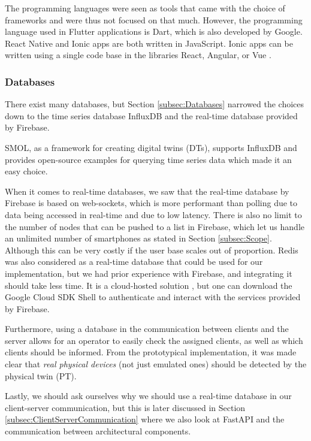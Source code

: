 \documentclass{article}
\begin{document}
The programming languages were seen as tools that came with the choice of frameworks and were thus not focused on that much. However, the programming language used in Flutter applications is Dart, which is also developed by Google. React Native and Ionic apps are both written in JavaScript. Ionic apps can be written using a single code base in the libraries React, Angular, or Vue \cite{noauthor_ionic_nodate}.

\subsubsection{Databases}\label{subsubsection:Databases}
There exist many databases, but Section \ref{subsec:Databases} narrowed the choices down to the time series database InfluxDB and the real-time database provided by Firebase. 

SMOL, as a framework for creating digital twins (DTs), supports InfluxDB and provides open-source examples for querying time series data which made it an easy choice. 

When it comes to real-time databases, we saw that the real-time database by Firebase is based on web-sockets, which is more performant than polling due to data being accessed in real-time and due to low latency. There is also no limit to the number of nodes that can be pushed to a list in Firebase, which let us handle an unlimited number of smartphones as stated in Section \ref{subsec:Scope}. Although this can be very costly if the user base scales out of proportion. Redis was also considered as a real-time database that could be used for our implementation, but we had prior experience with Firebase, and integrating it should take less time. It is a cloud-hosted solution \cite{noauthor_firebase_nodate}, but one can download the Google Cloud SDK Shell to authenticate and interact with the services provided by Firebase.

Furthermore, using a database in the communication between clients and the server allows for an operator to easily check the assigned clients, as well as which clients should be informed. From the prototypical implementation, it was made clear that \emph{real physical devices} (not just emulated ones) should be detected by the physical twin (PT). 

Lastly, we should ask ourselves why we should use a real-time database in our client-server communication, but this is later discussed in Section \ref{subsec:ClientServerCommunication} where we also look at FastAPI and the communication between architectural components.
\end{document}
